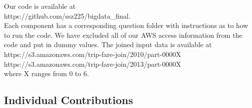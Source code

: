 \documentclass[twoside]{article}
\begin{document}
\begin{multicols}{2}
Our code is available at \\

\noindent https://github.com/ssz225/bigdata\_final.\\



Each component has a corresponding question folder with instructions as to how to run the code. We have excluded all of our AWS access information from the code and put in dummy values.  The joined input data is available at \\

\noindent https://s3.amazonaws.com/trip-fare-join/2010/part-0000X
\\
\noindent https://s3.amazonaws.com/trip-fare-join/2013/part-0000X
\\

\noindent where X ranges from 0 to 6.


\subsection{Individual Contributions}




\end{multicols}
\end{document}
